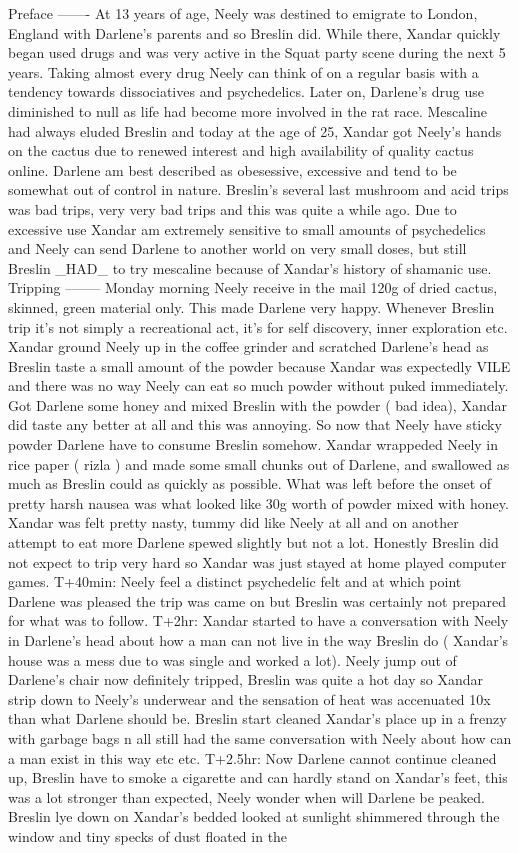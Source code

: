 \documentclass[12pt]{book}
\begin{document}
Preface ------- At 13 years of age, Neely was destined to emigrate to London, England with Darlene's parents and so Breslin did. While there, Xandar quickly began used drugs and was very active in the Squat party scene during the next 5 years. Taking almost every drug Neely can think of on a regular basis with a tendency towards dissociatives and psychedelics. Later on, Darlene's drug use diminished to null as life had become more involved in the rat race. Mescaline had always eluded Breslin and today at the age of 25, Xandar got Neely's hands on the cactus due to renewed interest and high availability of quality cactus online. Darlene am best described as obesessive, excessive and tend to be somewhat out of control in nature. Breslin's several last mushroom and acid trips was bad trips, very very bad trips and this was quite a while ago. Due to excessive use Xandar am extremely sensitive to small amounts of psychedelics and Neely can send Darlene to another world on very small doses, but still Breslin \_HAD\_ to try mescaline because of Xandar's history of shamanic use. Tripping -------- Monday morning Neely receive in the mail 120g of dried cactus, skinned, green material only. This made Darlene very happy. Whenever Breslin trip it's not simply a recreational act, it's for self discovery, inner exploration etc. Xandar ground Neely up in the coffee grinder and scratched Darlene's head as Breslin taste a small amount of the powder because Xandar was expectedly VILE and there was no way Neely can eat so much powder without puked immediately. Got Darlene some honey and mixed Breslin with the powder ( bad idea), Xandar did taste any better at all and this was annoying. So now that Neely have sticky powder Darlene have to consume Breslin somehow. Xandar wrappeded Neely in rice paper ( rizla ) and made some small chunks out of Darlene, and swallowed as much as Breslin could as quickly as possible. What was left before the onset of pretty harsh nausea was what looked like 30g worth of powder mixed with honey. Xandar was felt pretty nasty, tummy did like Neely at all and on another attempt to eat more Darlene spewed slightly but not a lot. Honestly Breslin did not expect to trip very hard so Xandar was just stayed at home played computer games. T+40min: Neely feel a distinct psychedelic felt and at which point Darlene was pleased the trip was came on but Breslin was certainly not prepared for what was to follow. T+2hr: Xandar started to have a conversation with Neely in Darlene's head about how a man can not live in the way Breslin do ( Xandar's house was a mess due to was single and worked a lot). Neely jump out of Darlene's chair now definitely tripped, Breslin was quite a hot day so Xandar strip down to Neely's underwear and the sensation of heat was accenuated 10x than what Darlene should be. Breslin start cleaned Xandar's place up in a frenzy with garbage bags n all still had the same conversation with Neely about how can a man exist in this way etc etc. T+2.5hr: Now Darlene cannot continue cleaned up, Breslin have to smoke a cigarette and can hardly stand on Xandar's feet, this was a lot stronger than expected, Neely wonder when will Darlene be peaked. Breslin lye down on Xandar's bedded looked at sunlight shimmered through the window and tiny specks of dust floated in the 
\end{document}
